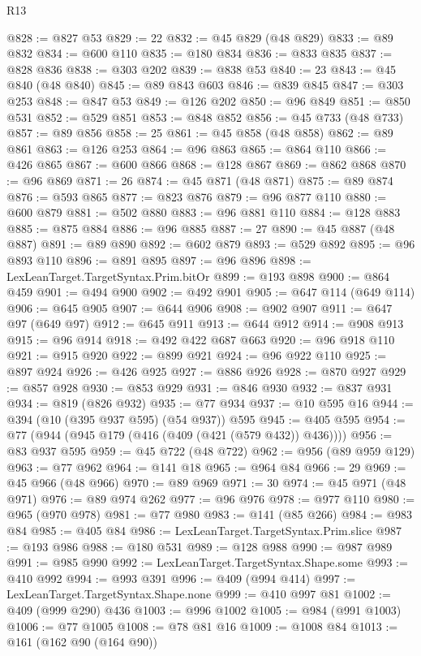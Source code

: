 \begin{lexlean}{R13}
\begin{coremodule}
@828 := @827 @53
@829 := 22
@832 := @45 @829 (@48 @829)
@833 := @89 @832
@834 := @600 @110
@835 := @180 @834
@836 := @833 @835
@837 := @828 @836
@838 := @303 @202
@839 := @838 @53
@840 := 23
@843 := @45 @840 (@48 @840)
@845 := @89 @843 @603
@846 := @839 @845
@847 := @303 @253
@848 := @847 @53
@849 := @126 @202
@850 := @96 @849
@851 := @850 @531
@852 := @529 @851
@853 := @848 @852
@856 := @45 @733 (@48 @733)
@857 := @89 @856
@858 := 25
@861 := @45 @858 (@48 @858)
@862 := @89 @861
@863 := @126 @253
@864 := @96 @863
@865 := @864 @110
@866 := @426 @865
@867 := @600 @866
@868 := @128 @867
@869 := @862 @868
@870 := @96 @869
@871 := 26
@874 := @45 @871 (@48 @871)
@875 := @89 @874
@876 := @593 @865
@877 := @823 @876
@879 := @96 @877 @110
@880 := @600 @879
@881 := @502 @880
@883 := @96 @881 @110
@884 := @128 @883
@885 := @875 @884
@886 := @96 @885
@887 := 27
@890 := @45 @887 (@48 @887)
@891 := @89 @890
@892 := @602 @879
@893 := @529 @892
@895 := @96 @893 @110
@896 := @891 @895
@897 := @96 @896
@898 := LexLeanTarget.TargetSyntax.Prim.bitOr
@899 := @193 @898
@900 := @864 @459
@901 := @494 @900
@902 := @492 @901
@905 := @647 @114 (@649 @114)
@906 := @645 @905
@907 := @644 @906
@908 := @902 @907
@911 := @647 @97 (@649 @97)
@912 := @645 @911
@913 := @644 @912
@914 := @908 @913
@915 := @96 @914
@918 := @492 @422 @687 @663
@920 := @96 @918 @110
@921 := @915 @920
@922 := @899 @921
@924 := @96 @922 @110
@925 := @897 @924
@926 := @426 @925
@927 := @886 @926
@928 := @870 @927
@929 := @857 @928
@930 := @853 @929
@931 := @846 @930
@932 := @837 @931
@934 := @819 (@826 @932)
@935 := @77 @934
@937 := @10 @595 @16
@944 := @394 (@10 (@395 @937 @595) (@54 @937)) @595
@945 := @405 @595
@954 := @77 (@944 (@945 @179 (@416 (@409 (@421 (@579 @432)) @436))))
@956 := @83 @937 @595
@959 := @45 @722 (@48 @722)
@962 := @956 (@89 @959 @129)
@963 := @77 @962
@964 := @141 @18
@965 := @964 @84
@966 := 29
@969 := @45 @966 (@48 @966)
@970 := @89 @969
@971 := 30
@974 := @45 @971 (@48 @971)
@976 := @89 @974 @262
@977 := @96 @976
@978 := @977 @110
@980 := @965 (@970 @978)
@981 := @77 @980
@983 := @141 (@85 @266)
@984 := @983 @84
@985 := @405 @84
@986 := LexLeanTarget.TargetSyntax.Prim.slice
@987 := @193 @986
@988 := @180 @531
@989 := @128 @988
@990 := @987 @989
@991 := @985 @990
@992 := LexLeanTarget.TargetSyntax.Shape.some
@993 := @410 @992
@994 := @993 @391
@996 := @409 (@994 @414)
@997 := LexLeanTarget.TargetSyntax.Shape.none
@999 := @410 @997 @81
@1002 := @409 (@999 @290) @436
@1003 := @996 @1002
@1005 := @984 (@991 @1003)
@1006 := @77 @1005
@1008 := @78 @81 @16
@1009 := @1008 @84
@1013 := @161 (@162 @90 (@164 @90))

\end{coremodule}
\end{lexlean}
